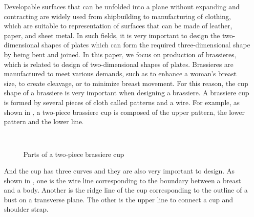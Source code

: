 \documentclass[E]{scitrans}
\begin{document}
Developable surfaces that can be unfolded into a plane without expanding and contracting are widely used from shipbuilding to manufacturing of clothing, which are suitable to representation of surfaces that can be made of leather, paper, and sheet metal. In such fields, it is very important to design the two-dimensional shapes of plates which can form the required three-dimensional shape by being bent and joined. In this paper, we focus on production of brassieres, which is related to design of two-dimensional shapes of plates. 
Brassieres are manufactured to meet various demands, such as to enhance a woman's breast size, to create cleavage, or to minimize breast movement. For this reason, the cup shape of a brassiere is very important when designing a brassiere. A brassiere cup is formed by several pieces of cloth called patterns and a wire. For example, as shown in , a two-piece brassiere cup is composed of the upper pattern, the lower pattern and the lower line.
\begin{figure}[h!]
	\centering
	\hfil
	\\
	\caption{Parts of a two-piece brassiere cup}
	\label{fig:patterns}
\end{figure}
 And the cup has three curves and they are also very important to design. As shown in , one is the wire line corresponding to the boundary between a breast and a body. Another is the ridge line of the cup corresponding to the outline of a bust on a transverse plane. The other is the upper line to connect a cup and shoulder strap. 
\end{document}
